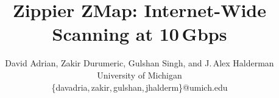 \documentclass[letterpaper,twocolumn,10pt]{article}
\begin{document}
\thispagestyle{empty}

\newcommand{\bbZ}{\mathbb{Z}}

\date{}

\title{\Large\bf Zippier ZMap: Internet-Wide Scanning at 10\,Gbps}

\author{
{\rm David Adrian, Zakir Durumeric, Gulshan Singh, and J.\,Alex Halderman}\smallskip\\
University of Michigan\\
\small\rm\{davadria,\,zakir,\,gulshan,\,jhalderm\}@umich.edu
}
 

\maketitle
\end{document}
